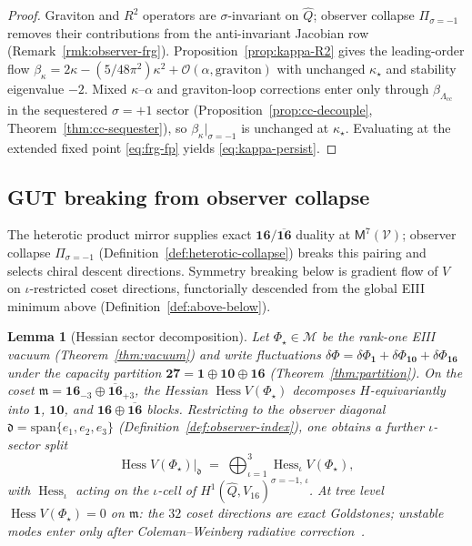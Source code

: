 \documentclass[aps,prd,onecolumn,amsmath,amssymb,nofootinbib,11pt]{revtex4-2}
\numberwithin{equation}{section}
\theoremstyle{plain}
\newtheorem{lemma}[theorem]{Lemma}
\theoremstyle{definition}
\theoremstyle{remark}
\newcommand{\Void}{\mathcal{V}}
\newcommand{\Mirror}{\mathsf{M}}
\newcommand{\orderparam}{\Phi}
\newcommand{\Hess}{\operatorname{Hess}}
\begin{document}
\begin{proof}
Graviton and $R^2$ operators are $\sigma$-invariant on $\hat Q$; observer
collapse $\Pi_{\sigma=-1}$ removes their contributions from the anti-invariant
Jacobian row (Remark~\ref{rmk:observer-frg}). Proposition~\ref{prop:kappa-R2}
gives the leading-order flow
$\beta_\kappa=2\kappa-(5/48\pi^2)\kappa^2+\mathcal{O}(\alpha,\text{graviton})$
with unchanged $\kappa_\star$ and stability eigenvalue $-2$. Mixed
$\kappa$--$\alpha$ and graviton-loop corrections enter only through
$\beta_{\Lambda_{\mathrm{cc}}}$ in the sequestered $\sigma=+1$ sector
(Proposition~\ref{prop:cc-decouple}, Theorem~\ref{thm:cc-sequester}), so
$\beta_\kappa|_{\sigma=-1}$ is unchanged at $\kappa_\star$. Evaluating at the
extended fixed point \eqref{eq:frg-fp} yields \eqref{eq:kappa-persist}.
\end{proof}

\subsection{GUT breaking from observer collapse}
\label{sec:physics:breaking}

The heterotic product mirror supplies exact
$\mathbf{16}/\overline{\mathbf{16}}$ duality at $\Mirror^7(\Void)$; observer
collapse $\Pi_{\sigma=-1}$ (Definition~\ref{def:heterotic-collapse}) breaks
this pairing and selects chiral descent directions. Symmetry breaking below is
gradient flow of $V$ on $\iota$-restricted coset directions, functorially
descended from the global EIII minimum above
(Definition~\ref{def:above-below}).

\begin{lemma}[Hessian sector decomposition]\label{lem:breaking-hess}
Let $\orderparam_\star\in\mathcal{M}$ be the rank-one EIII vacuum
(Theorem~\ref{thm:vacuum}) and write fluctuations
$\delta\orderparam=\delta\orderparam_{\mathbf{1}}+\delta\orderparam_{\mathbf{10}}+\delta\orderparam_{\mathbf{16}}$
under the capacity partition
$\mathbf{27}=\mathbf{1}\oplus\mathbf{10}\oplus\mathbf{16}$
(Theorem~\ref{thm:partition}). On the coset
$\mathfrak{m}=\mathbf{16}_{-3}\oplus\overline{\mathbf{16}}_{+3}$, the Hessian
$\Hess V(\orderparam_\star)$ decomposes $H$-equivariantly into $\mathbf{1}$,
$\mathbf{10}$, and $\mathbf{16}\oplus\overline{\mathbf{16}}$ blocks. Restricting
to the observer diagonal $\mathfrak{d}=\mathrm{span}\{e_1,e_2,e_3\}$
(Definition~\ref{def:observer-index}), one obtains a further $\iota$-sector
split
\begin{equation}\label{eq:breaking-hess-iota}
  \Hess V(\orderparam_\star)\big|_{\mathfrak{d}}
  \;=\;
  \bigoplus_{\iota=1}^3 \Hess_\iota V(\orderparam_\star),
\end{equation}
with $\Hess_\iota$ acting on the $\iota$-cell of
$H^1(\hat Q,V_{16})^{\sigma=-1,\,\iota}$. At tree level
$\Hess V(\orderparam_\star)=0$ on $\mathfrak{m}$: the $32$ coset directions are
exact Goldstones; unstable modes enter only after Coleman--Weinberg radiative
correction~\cite{ColemanWeinberg1973}.
\end{lemma}
\end{document}
